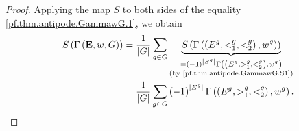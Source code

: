 \documentclass[12pt]{article}
\theoremstyle{plain}
\theoremstyle{definition}
\theoremstyle{remark}
\let\sumnonlimits\sum
\renewcommand{\sum}{\sumnonlimits\limits}
\newcommand{\EE}{{\mathbf{E}}}
\begin{document}
\begin{proof}
Applying the map $S$ to both sides of the equality
\eqref{pf.thm.antipode.GammawG.1}, we obtain
\begin{align}
S\left(  \Gamma\left(  { \EE },w,G\right)  \right)
& = \dfrac{1}{
\left\vert G\right\vert }\sum_{g\in G}\underbrace{S\left(  \Gamma\left(
\left(  E^{g},<_{1}^{g},<_{2}^{g}\right)  ,w^{g}\right)  \right)
}_{\substack{=\left(  -1\right)  ^{\left\vert E^{g}\right\vert }\Gamma\left(
\left(  E^{g},>_{1}^{g},<_{2}^{g}\right)  ,w^{g}\right)  \\\text{(by
\eqref{pf.thm.antipode.GammawG.S1})}}}\nonumber\\
& =\dfrac{1}{\left\vert G\right\vert }\sum_{g\in G}\left(  -1\right)
^{\left\vert E^{g}\right\vert }
\Gamma\left(  \left(  E^{g},>_{1}^{g},<_{2}^{g}\right)  ,w^{g}\right)
.
\label{pf.thm.antipode.GammawG.1S}
\end{align}



\end{proof}
\end{document}

